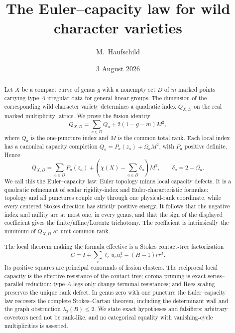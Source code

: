 \documentclass[11pt,a4paper]{amsart}
\theoremstyle{plain}
\theoremstyle{definition}
\begin{document}
\title[The Euler--capacity law]{The Euler--capacity law for wild character varieties}

\author{M.~Haufschild}
\address{Independent researcher}
\date{3 August 2026}


\begin{abstract}
Let $X$ be a compact curve of genus $g$ with a nonempty set $D$ of $m$ marked points carrying
type-$A$ irregular data for general linear groups.  The dimension of the corresponding wild character
variety determines a quadratic index $Q_{X,D}$ on the real marked multiplicity lattice.  We prove
the fusion identity
\[
 Q_{X,D}=\sum_{a\in D}Q_a+2(1-g-m)M^2,
\]
where $Q_a$ is the one-puncture index and $M$ is the common total rank.  Each local index has a
canonical capacity completion $Q_a=P_a(z_a)+\Omega_aM^2$, with $P_a$ positive definite.  Hence
\[
 \boxed{\quad Q_{X,D}=\sum_{a\in D}P_a(z_a)
       +\left(\chi(X)-\sum_{a\in D}\delta_a\right)M^2,\qquad
       \delta_a=2-\Omega_a.\quad}
\]
We call this the Euler--capacity law: Euler topology minus local capacity defects.  It is a
quadratic refinement of scalar rigidity-index and
Euler-characteristic formulae: topology and all punctures couple only through one physical-rank
coordinate, while every centered Stokes direction has strictly positive energy.  It follows that
the negative index and nullity are at most one, in every genus, and that the sign of the displayed
coefficient gives the finite/affine/Lorentz trichotomy.  The coefficient is intrinsically the
minimum of $Q_{X,D}$ at unit common rank.

The local theorem making the formula effective is a Stokes contact-tree factorization
\[
 C=I+\sum_e\ell_eu_eu_e^T-(H-1)rr^T.
\]
Its positive squares are principal conormals of fission clusters.  The reciprocal local capacity
is the effective resistance of the contact tree; corona pruning is exact series--parallel
reduction; type-$A$ legs only change terminal resistances; and Rees scaling preserves the unique
rank defect.  In genus zero with one puncture the Euler--capacity law recovers the complete
Stokes--Cartan theorem, including the determinant wall and the graph obstruction
$\lambda_2(B)\leq2$.  We state exact hypotheses and falsifiers: arbitrary covectors need not be
rank-like, and no categorical equality with vanishing-cycle multiplicities is asserted.
\end{abstract}
\end{document}
